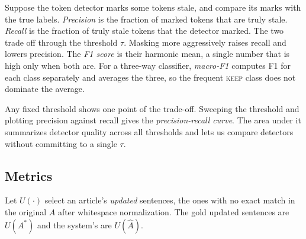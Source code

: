 \documentclass[]{paper}
\newcommand{\keep}{\textsc{keep}}
\begin{document}
Suppose the token detector marks some tokens stale, and compare its marks with the true labels. \emph{Precision} is the fraction of marked tokens that are truly stale. \emph{Recall} is the fraction of truly stale tokens that the detector marked. The two trade off through the threshold $\tau$. Masking more aggressively raises recall and lowers precision. The \emph{F1 score} is their harmonic mean, a single number that is high only when both are. For a three-way classifier, \emph{macro-F1} computes F1 for each class separately and averages the three, so the frequent \keep{} class does not dominate the average.

Any fixed threshold shows one point of the trade-off. Sweeping the threshold and plotting precision against recall gives the \emph{precision-recall curve}. The area under it summarizes detector quality across all thresholds and lets us compare detectors without committing to a single $\tau$.

\subsection{Metrics}
\label{sec:metrics}

Let $U(\cdot)$ select an article's \emph{updated} sentences, the ones with no exact match in the original $A$ after whitespace normalization. The gold updated sentences are $U(A^\ast)$ and the system's are $U(\hat{A})$.
\end{document}
